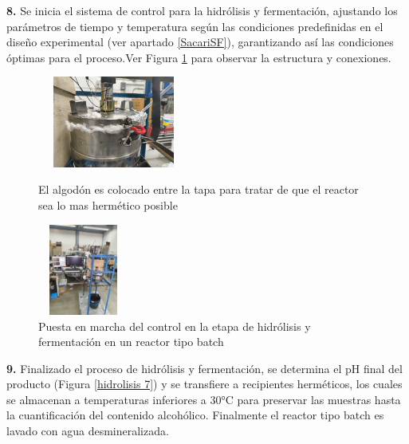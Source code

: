 \documentclass[12pt]{article}
\begin{document}
	     
	     	\textbf{8.} Se inicia el sistema de control para la hidrólisis y fermentación, ajustando los parámetros de tiempo y temperatura según las condiciones predefinidas en el diseño experimental (ver apartado \ref{SacariSF}), garantizando así las condiciones óptimas para el proceso.Ver Figura \ref{hidrolisis 8} para observar la estructura y conexiones.
	     	
	 
	     		     \begin{figure}[H]
	     		\centering
	     		\begin{minipage}{0.46\textwidth}
	     			\centering
	     			\includegraphics[width=5cm, height=3cm]{imagenes/hidrolisis 6} %
	     			\caption{ El algodón es colocado entre la tapa para tratar de que el reactor sea lo mas hermético posible }
	     			\label{hidrolisis  6}
	     		\end{minipage}
	     		\hfill
	     		\begin{minipage}{0.48\textwidth}
	     			\centering
	     			\includegraphics[width=3cm, height=3cm]{imagenes/conexion de hidrolisis } %
	     			\caption{ Puesta en marcha del control en la etapa de hidrólisis y fermentación en un reactor tipo batch}
	     			\label{hidrolisis 8}
	     		\end{minipage}
	     	\end{figure}
	     	
	     	
	     	\textbf{9.} Finalizado el proceso de hidrólisis y fermentación, se determina el pH final del producto (Figura \ref{hidrolisis 7}) y se transfiere a recipientes herméticos, los cuales se almacenan a temperaturas inferiores a 30°C para preservar las muestras hasta la cuantificación del contenido alcohólico. Finalmente el reactor tipo batch es lavado con agua desmineralizada.
	     	
\end{document}
